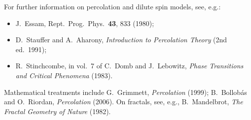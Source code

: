 \begin{diagram}
\end{diagram}

For further information on percolation and dilute spin models, see, e.g.:
\begin{itemize}
  \item J.~Essam, Rept.\ Prog.\ Phys.\ \textbf{43}, 833 (1980);
  \item D.~Stauffer and A.~Aharony, \emph{Introduction to Percolation Theory} (2nd ed.\ 1991);
  \item R.~Stinchcombe, in vol.~7 of C.~Domb and J.~Lebowitz, \emph{Phase Transitions and Critical Phenomena} (1983).
\end{itemize}
Mathematical treatments include G.~Grimmett, \emph{Percolation} (1999); B.~Bollob\'as and O.~Riordan, \emph{Percolation}
(2006). On fractals, see, e.g., B.~Mandelbrot, \emph{The Fractal Geometry of Nature} (1982).
